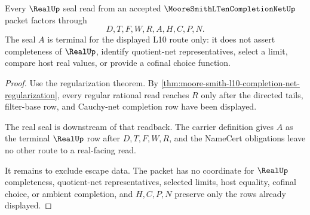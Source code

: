 \begin{theorem}\label{thm:moore-smith-l10-completion-net-real-seal-nonescape}
Every $\RealUp$ seal read from an accepted $\MooreSmithLTenCompletionNetUp$ packet factors through
$$
D,T,F,W,R,A,H,C,P,N .
$$
The seal $A$ is terminal for the displayed L10 route only: it does not assert completeness of $\RealUp$, identify quotient-net representatives, select a limit, compare host real values, or provide a cofinal choice function.
\end{theorem}
\begin{proof}
Use the regularization theorem. By \autoref{thm:moore-smith-l10-completion-net-regularization}, every regular rational read reaches $R$ only after the directed tails, filter-base row, and Cauchy-net completion row have been displayed.

The real seal is downstream of that readback. The carrier definition gives $A$ as the terminal $\RealUp$ row after $D,T,F,W,R$, and the NameCert obligations leave no other route to a real-facing read.

It remains to exclude escape data. The packet has no coordinate for $\RealUp$ completeness, quotient-net representatives, selected limits, host equality, cofinal choice, or ambient completion, and $H,C,P,N$ preserve only the rows already displayed.
\end{proof}




